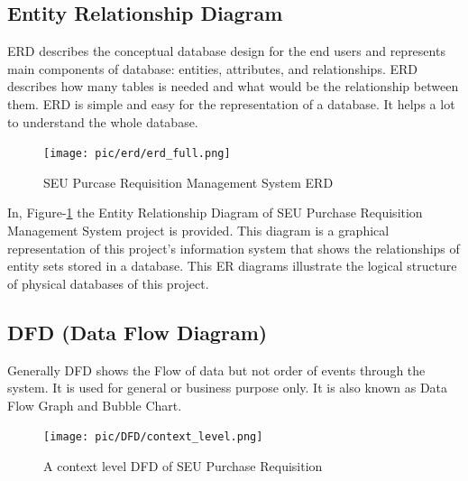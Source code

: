 \documentclass[12pt]{report} %
\begin{document}
\subsection{Entity Relationship Diagram}
ERD describes the conceptual database design for the end users and represents  main components of database: entities, attributes, and relationships. ERD describes how many tables is needed and what would be the relationship between them. ERD is simple and easy for the representation of a database. It helps a lot to understand the whole database.\\

\begin{figure}[h]
	\begin{center}
	\texttt{[image: pic/erd/erd\_full.png]}
	\end{center}
	\caption{SEU Purcase Requisition Management System ERD}
	\label{fig:erd_full1}
\end{figure}
\clearpage

In, Figure-\ref{fig:erd_full1} the Entity Relationship Diagram of SEU Purchase Requisition Management System project is provided. This diagram is a graphical representation of this project's information system that shows the relationships of entity sets stored in a database. This ER diagrams illustrate the logical structure of physical databases of this project.









\subsection{DFD (Data Flow Diagram)}
Generally DFD shows the Flow of data but not order of events through the system. It is used for general or business purpose only. It is also known as Data Flow Graph and Bubble Chart.

\begin{figure}[h]
	\texttt{[image: pic/DFD/context\_level.png]}
	\caption{A context level DFD of SEU Purchase Requisition}
	\label{fig:context_level}
\end{figure}
\clearpage


\end{document}
